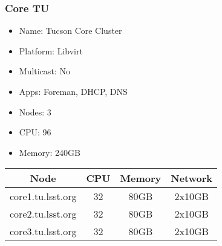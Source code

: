 \subsubsection{Core TU}
\begin{itemize}
  \itemsep0em 
  \item Name:      Tucson Core Cluster
  \item Platform:  Libvirt
  \item Multicast: No
  \item Apps:      Foreman, DHCP, DNS
  \item Nodes:     3
  \item CPU:       96
  \item Memory:    240GB
\end{itemize}
\begin{center}
  \small
  \begin{tabular}{||c c c c||}
    \hline
    Node & CPU & Memory & Network \\ [0.5ex]
    \hline
    core1.tu.lsst.org & 32 & 80GB & 2x10GB \\
    \hline
    core2.tu.lsst.org & 32 & 80GB & 2x10GB \\
    \hline
    core3.tu.lsst.org & 32 & 80GB & 2x10GB \\
    \hline
  \end{tabular}
\end{center}